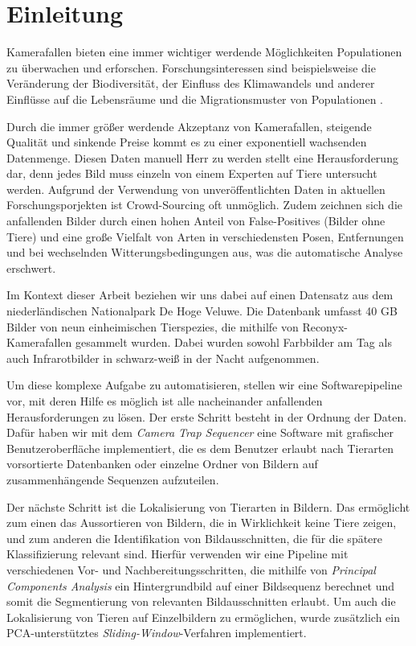 \newpage
\section{Einleitung}

Kamerafallen bieten eine immer wichtiger werdende Möglichkeiten Populationen zu überwachen und erforschen. Forschungsinteressen sind beispielsweise die Veränderung der Biodiversität, der Einfluss des Klimawandels und anderer Einflüsse auf die Lebensräume und die Migrationsmuster von Populationen \cite{ywkjwh13}.

Durch die immer größer werdende Akzeptanz von Kamerafallen, steigende Qualität und sinkende Preise kommt es zu einer exponentiell wachsenden Datenmenge. Diesen Daten manuell Herr zu werden stellt eine Herausforderung dar, denn jedes Bild muss einzeln von einem Experten auf Tiere untersucht werden. Aufgrund der Verwendung von unveröffentlichten Daten in aktuellen Forschungsporjekten ist Crowd-Sourcing oft unmöglich. Zudem zeichnen sich die anfallenden Bilder durch einen hohen Anteil von False-Positives (Bilder ohne Tiere) und eine große Vielfalt von Arten in verschiedensten Posen, Entfernungen und bei wechselnden Witterungsbedingungen aus, was die automatische Analyse erschwert.

Im Kontext dieser Arbeit beziehen wir uns dabei auf einen Datensatz aus dem niederländischen Nationalpark De Hoge Veluwe. Die Datenbank umfasst 40 GB Bilder von neun einheimischen Tierspezies, die mithilfe von Reconyx-Kamerafallen gesammelt wurden. Dabei wurden sowohl Farbbilder am Tag als auch Infrarotbilder in schwarz-weiß in der Nacht aufgenommen.

Um diese komplexe Aufgabe zu automatisieren, stellen wir eine Softwarepipeline vor, mit deren Hilfe es möglich ist alle nacheinander anfallenden Herausforderungen zu lösen. Der erste Schritt besteht in der Ordnung der Daten. Dafür haben wir mit dem \emph{Camera Trap Sequencer} eine Software mit grafischer Benutzeroberfläche implementiert, die es dem Benutzer erlaubt nach Tierarten vorsortierte Datenbanken oder einzelne Ordner von Bildern auf zusammenhängende Sequenzen aufzuteilen.

Der nächste Schritt ist die Lokalisierung von Tierarten in Bildern. Das ermöglicht zum einen das Aussortieren von Bildern, die in Wirklichkeit keine Tiere zeigen, und zum anderen die Identifikation von Bildausschnitten, die für die spätere Klassifizierung relevant sind. Hierfür verwenden wir eine Pipeline mit verschiedenen Vor- und Nachbereitungsschritten, die mithilfe von \emph{Principal Components Analysis} ein Hintergrundbild auf einer Bildsequenz berechnet und somit die Segmentierung von relevanten Bildausschnitten erlaubt. Um auch die Lokalisierung von Tieren auf Einzelbildern zu ermöglichen, wurde zusätzlich ein PCA-unterstütztes \emph{Sliding-Window}-Verfahren implementiert. 

